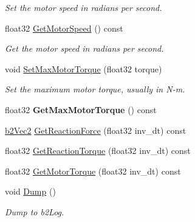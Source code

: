 \begin{DoxyCompactItemize}
\begin{DoxyCompactList}\small\item\em Set the motor speed in radians per second. \end{DoxyCompactList}\item 
\hypertarget{classb2_revolute_joint_a5ebdb2b410725d2c7999d8fce792e0da}{float32 \hyperlink{classb2_revolute_joint_a5ebdb2b410725d2c7999d8fce792e0da}{Get\-Motor\-Speed} () const }\label{classb2_revolute_joint_a5ebdb2b410725d2c7999d8fce792e0da}

\begin{DoxyCompactList}\small\item\em Get the motor speed in radians per second. \end{DoxyCompactList}\item 
\hypertarget{classb2_revolute_joint_a41779d7ec05be33e6368ef00123a3581}{void \hyperlink{classb2_revolute_joint_a41779d7ec05be33e6368ef00123a3581}{Set\-Max\-Motor\-Torque} (float32 torque)}\label{classb2_revolute_joint_a41779d7ec05be33e6368ef00123a3581}

\begin{DoxyCompactList}\small\item\em Set the maximum motor torque, usually in N-\/m. \end{DoxyCompactList}\item 
\hypertarget{classb2_revolute_joint_a1e990f811430b831967c856adfe452a0}{float32 {\bfseries Get\-Max\-Motor\-Torque} () const }\label{classb2_revolute_joint_a1e990f811430b831967c856adfe452a0}

\item 
\hyperlink{structb2_vec2}{b2\-Vec2} \hyperlink{classb2_revolute_joint_a1e5d6eb28f3f35e825cfc42dbd23d66e}{Get\-Reaction\-Force} (float32 inv\-\_\-dt) const 
\item 
float32 \hyperlink{classb2_revolute_joint_a85cdf204bf80dc0a4df6536e2e9a941e}{Get\-Reaction\-Torque} (float32 inv\-\_\-dt) const 
\item 
float32 \hyperlink{classb2_revolute_joint_a64579cb1db5e9674ec17244133c72920}{Get\-Motor\-Torque} (float32 inv\-\_\-dt) const 
\item 
\hypertarget{classb2_revolute_joint_aa9d88f5476c77a5c4a6ef5b2ad0d3e6f}{void \hyperlink{classb2_revolute_joint_aa9d88f5476c77a5c4a6ef5b2ad0d3e6f}{Dump} ()}\label{classb2_revolute_joint_aa9d88f5476c77a5c4a6ef5b2ad0d3e6f}

\begin{DoxyCompactList}\small\item\em Dump to b2\-Log. \end{DoxyCompactList}\end{DoxyCompactItemize}
